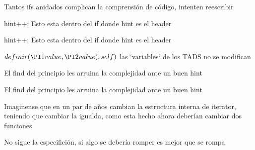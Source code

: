 \begin{DoxyRefList}
Tantos ifs anidados complican la comprensión de código, intenten reescribir

hint++; Esto esta dentro del if donde hint es el header 

hint++; Esto esta dentro del if donde hint es el header  
\item[\label{deprecated__deprecated000014}%
\hypertarget{deprecated__deprecated000014}{}%
Miembro \hyperlink{classaed2_1_1map_a2ef6723c183916276b0afc4a4c721475_a2ef6723c183916276b0afc4a4c721475}{aed2\+:\+:map$<$ Key, Meaning, Compare $>$\+:\+:insert\+\_\+or\+\_\+assign} (\hyperlink{classaed2_1_1map_1_1const__iterator}{const\+\_\+iterator} hint, const value\+\_\+type \&value)]$ definir(\PI1 value, \PI2 value), self) $ las \char`\"{}variables\char`\"{} de los T\+A\+DS no se modifican

El find del principio les arruina la complejidad ante un buen hint

El find del principio les arruina la complejidad ante un buen hint 
\item[\label{deprecated__deprecated000025}%
\hypertarget{deprecated__deprecated000025}{}%
Miembro \hyperlink{classaed2_1_1map_1_1iterator_a836c7a166d63f507c4f79085ae953c51_a836c7a166d63f507c4f79085ae953c51}{aed2\+:\+:map$<$ Key, Meaning, Compare $>$\+:\+:iterator\+:\+:operator!=} (iterator other) const ]Imaginense que en un par de años cambian la estructura interna de iterator, teniendo que cambiar la igualda, como esta hecho ahora deberían cambiar dos funciones 
\item[\label{deprecated__deprecated000023}%
\hypertarget{deprecated__deprecated000023}{}%
Miembro \hyperlink{classaed2_1_1map_1_1iterator_a7c44de7f0508186e135ddbcfe782fec5_a7c44de7f0508186e135ddbcfe782fec5}{aed2\+:\+:map$<$ Key, Meaning, Compare $>$\+:\+:iterator\+:\+:operator++} ()]No sigue la especifición, si algo se debería romper es mejor que se rompa 


\end{DoxyRefList}
